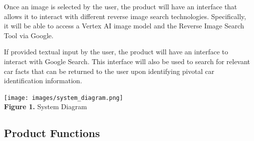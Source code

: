 \documentclass[]{article}
\begin{document}
Once an image is selected by the user, the product will have an interface that allows it to interact with different reverse image search technologies. Specifically, it will be able to access a Vertex AI image model and the Reverse Image Search Tool via Google.

If provided textual input by the user, the product will have an interface to interact with Google Search. This interface will also be used to search for relevant car facts that can be returned to the user upon identifying pivotal car identification information.

\begin{center}
	\texttt{[image: images/system\_diagram.png]} \\
	\textbf{Figure 1. } System Diagram
\end{center}


\newpage
\subsection{Product Functions}
\label{sub:product_functions}

\end{document}
